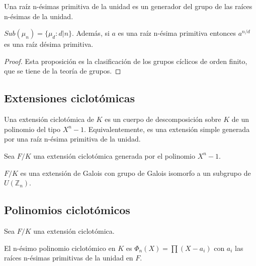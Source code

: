 \begin{definition}
Una raíz n-ésimas primitiva de la unidad es un generador del grupo de las raíces n-ésimas de la unidad. 
\end{definition}

\begin{proposition}
$Sub(\mu_n) = \{\mu_d:d | n \}$. Además, si $a$ es una raíz n-ésima primitiva entonces $a^{n/d}$ es una raíz désima primitiva. 
\end{proposition}
\begin{proof}
Esta proposición es la clasificación de los grupos cíclicos de orden finito, que se tiene de la teoría de grupos. 
\end{proof}

\subsection{Extensiones ciclotómicas}

\begin{definition}
Una extensión ciclotómica de $K$ es un cuerpo de descomposición sobre $K$ de un polinomio del tipo $X^n-1$. Equivalentemente, es una extensión simple generada por una raíz n-ésima primitiva de la unidad. 
\end{definition}

\begin{theorem}
Sea $F/K$ una extensión ciclotómica generada por el polinomio $X^n-1$. 

$F/K$ es una extensión de Galois con grupo de Galois isomorfo a un subgrupo de $U(\mathbb{Z}_n)$.
\end{theorem}

\subsection{Polinomios ciclotómicos}

\begin{definition}
Sea $F/K$ una extensión ciclotómica. 

El n-ésimo polinomio ciclotómico en $K$ es $\Phi_n(X) = \prod (X-a_i)$ con $a_i$ las raíces n-ésimas primitivas de la unidad en $F$. 
\end{definition}

